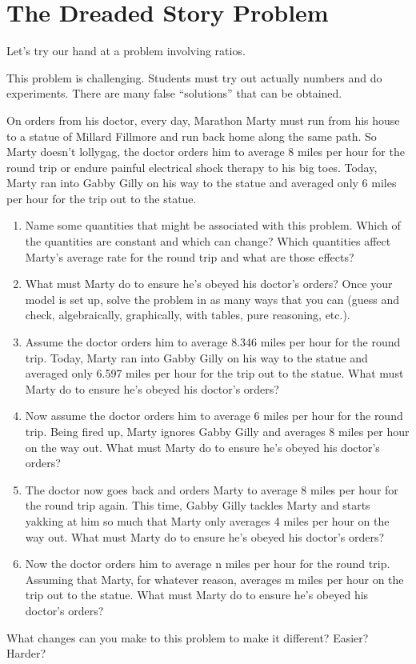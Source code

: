 \newpage
\section{The Dreaded Story Problem}\label{A:dreadedStoryProblem}

Let's try our hand at a problem involving ratios.

\begin{teachingnote}
This problem is challenging. Students must try out actually
numbers and do experiments. There are many false ``solutions'' that can be obtained.
\end{teachingnote}


\begin{prob}
On orders from his doctor, every day, Marathon Marty must run from his
house to a statue of Millard Fillmore and run back home along the same
path.  So Marty doesn't lollygag, the doctor orders him to average 8
miles per hour for the round trip or endure painful electrical shock
therapy to his big toes.  Today, Marty ran into Gabby Gilly on his way
to the statue and averaged only 6 miles per hour for the trip out to
the statue.
\begin{enumerate}
\item Name some quantities that might be associated with this problem.
Which of the quantities are constant and which can change? Which
quantities affect Marty's average rate for the round trip and what are
those effects?

\item What must Marty do to ensure he's obeyed his doctor's orders? 
Once your model is set up, solve the problem in as many ways that you
can (guess and check, algebraically, graphically, with tables, pure
reasoning, etc.).

\item Assume the doctor orders him to average 8.346 miles per hour for the round trip.
Today, Marty ran into Gabby Gilly on his way to the statue and
averaged only 6.597 miles per hour for the trip out to the statue.
What must Marty do to ensure he's obeyed his doctor's orders?
\item Now assume the doctor orders him to average 6 miles per hour for the round trip.
Being fired up, Marty ignores Gabby Gilly and averages 8 miles per
hour on the way out.  What must Marty do to ensure he's obeyed his
doctor's orders?
\item The doctor now goes back and orders Marty to average 8 miles per hour for the round trip again.
This time, Gabby Gilly tackles Marty and starts yakking at him so much
that Marty only averages 4 miles per hour on the way out.  What must
Marty do to ensure he's obeyed his doctor's orders?
\item Now the doctor orders him to average n miles per hour for the round trip.
Assuming that Marty, for whatever reason, averages m miles per hour on
the trip out to the statue. What must Marty do to ensure he's obeyed
his doctor's orders?
\end{enumerate}
\end{prob}

\begin{prob}
What changes can you make to this problem to make it different?
Easier? Harder?
\end{prob}
